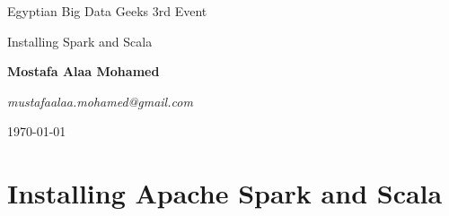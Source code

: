 \documentclass[]{article}
\begin{document}
\begin{titlepage}
	\centering

	{\LARGE Egyptian Big Data Geeks 3rd Event \par}
	\vspace{1cm}
	{\Large Installing Spark and Scala\par}
	\vspace{1.5cm}
	{\huge\bfseries Mostafa Alaa Mohamed\par}
	{\Large\itshape mustafaalaa.mohamed@gmail.com\par}

	\vfill

	{\large \today\par}
\end{titlepage}

\begin{abstract}
This Document introduce How to install spark into local Machine. This document doesn't have any copy-writes and I collected and copied from Internet content to be easy for who need to install spark into one document. This document generated by \LaTeX  \ and code will be found into the following link
\end{abstract}

\section{Installing Apache Spark and Scala}
\end{document}

